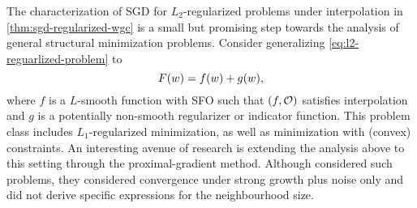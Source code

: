 The characterization of SGD for \( L_2 \)-regularized problems  under interpolation in \autoref{thm:sgd-regularized-wgc} is a small but promising step towards the analysis of general structural minimization problems.
Consider generalizing \autoref{eq:l2-reguarlized-problem} to 
\[ F(\w) = f(\w) + g(\w), \]
where \( f \) is a \( L \)-smooth function with SFO \oracle{} such that \( \rbr{f, \oracle{}} \) satisfies interpolation and \( g \) is a potentially non-smooth regularizer or indicator function. 
This problem class includes \( L_1 \)-regularized minimization, as well as minimization with (convex) constraints.
An interesting avenue of research is extending the analysis above to this setting through the proximal-gradient method.
Although \citet{cevher2018linear} considered such problems, they considered convergence under strong growth plus noise only and did not derive specific expressions for the neighbourhood size.

